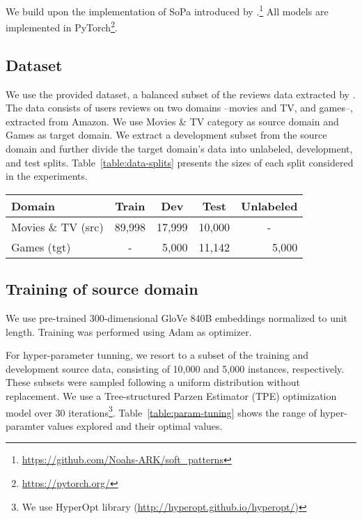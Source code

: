 \documentclass[11pt,a4paper]{article}
\begin{document}
We build upon the implementation of SoPa introduced by \citet{schwartz2018sopa}.\footnote{\url{https://github.com/Noahs-ARK/soft_patterns}} All models are implemented in PyTorch\footnote{\url{https://pytorch.org/}}.

\subsection{Dataset}

We use the provided dataset, a balanced subset of the reviews data extracted by \citet{mcauley2015image}. The data consists of users reviews on two domains --movies and TV, and games--, extracted from Amazon.
We use Movies \& TV category as source domain and Games as target domain. We extract a development subset from the source domain and further divide the target domain's data into unlabeled, development, and test splits. Table~\ref{table:data-splits} presents the sizes of each split considered in the experiments.

\begin{table*}[]
\centering
\begin{tabular}{|l|c|r|r|c|}
\hline
Domain              & Train                       & \multicolumn{1}{c|}{Dev} & \multicolumn{1}{c|}{Test} & Unlabeled                  \\ \hline
Movies \& TV (src) & \multicolumn{1}{r|}{89,998} & 17,999                   & 10,000                    & -                          \\ \hline
Games (tgt)         & -                           & 5,000                    & 11,142                    & \multicolumn{1}{r|}{5,000} \\ \hline
\end{tabular}
\caption{Size of data splits in source (src) and target (tgt) domains.}
\label{table:data-splits}
\end{table*}

\subsection{Training of source domain}

We use pre-trained 300-dimensional GloVe 840B embeddings \citet{pennington2014glove} normalized to unit length. Training was performed using Adam \cite{kingma2014adam} as optimizer.

For hyper-parameter tunning, we resort to a subset of the training and development source data, consisting of 10,000 and 5,000 instances, respectively. These subsets were sampled following a uniform distribution without replacement. We use a Tree-structured Parzen Estimator (TPE) optimization model over 30 iterations\footnote{We use HyperOpt library (\url{http://hyperopt.github.io/hyperopt/})}. Table~\ref{table:param-tuning} shows the range of hyper-paramter values explored and their optimal values.
\end{document}
